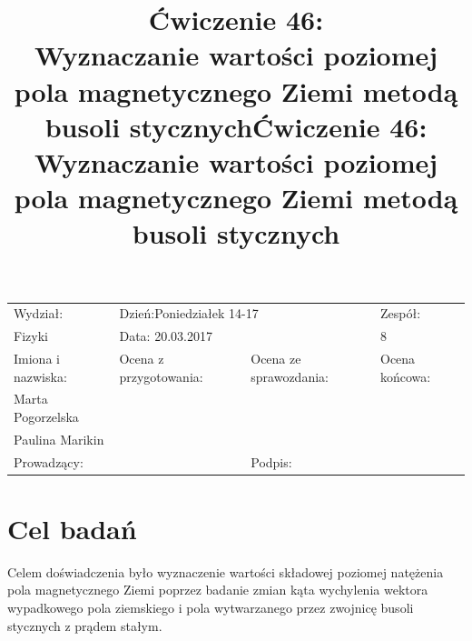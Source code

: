 \documentclass[a4paper,10pt]{article}
\def\arraystretch{1.2}
\begin{document}
\begin{table}
  \centering
  \def\arraystretch{1.5}
    \begin{tabular}{|l|l|l|l|} \hline
    Wydział:           & \multicolumn{2}{l|}{Dzień:Poniedziałek 14-17}    &Zespół:  \\
    Fizyki             &    \multicolumn{2}{l|}{Data: 20.03.2017}         &8             \\\hline
    Imiona i nazwiska: &Ocena z przygotowania:  &Ocena ze sprawozdania:   &Ocena końcowa: \\
    Marta Pogorzelska  &                        &                         &                \\
    Paulina Marikin    &                        &                         &\\\hline
    \multicolumn{2}{|l|}{Prowadzący:                 } &\multicolumn{2}{l|}{Podpis:             }  \\\hline
  \end{tabular}
\end{table}


\title{Ćwiczenie 46:\\Wyznaczanie wartości poziomej pola magnetycznego Ziemi metodą busoli stycznych}
\date{}
\maketitle{}

\title{Ćwiczenie 46:\\Wyznaczanie wartości poziomej pola magnetycznego Ziemi metodą busoli stycznych}
\date{}
\maketitle{}

\section{Cel badań}
Celem doświadczenia było wyznaczenie wartości składowej poziomej natężenia pola magnetycznego Ziemi poprzez badanie zmian kąta wychylenia wektora wypadkowego pola ziemskiego i pola wytwarzanego przez zwojnicę busoli stycznych z prądem stałym.
\end{document}
